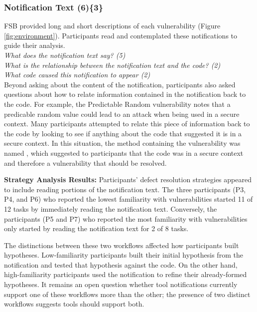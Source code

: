 \documentclass[10pt,journal,compsoc]{IEEEtran}
\begin{document}
\subsubsection{Notification Text (6)\{3\}}\label{em}

FSB provided long and short descriptions of each vulnerability (Figure \ref{fig:environment}). 
Participants read and contemplated these notifications to guide their analysis.
\\

\noindent\emph{What does the notification text say? (5)} \\
\emph{What is the relationship between the notification text and the code? (2)} \\
\emph{What code caused this notification to appear (2)} 
\\

Beyond asking about the content of the notification, participants also asked questions about how to relate information contained in the notification back to the code. 
For example, the Predictable Random vulnerability notes that a predicable random value could lead to an attack when being used in a secure context. 
Many participants attempted to relate this piece of information back to the code by looking to see if anything about the code that suggested it is in a secure context. 
In this situation, the method containing the vulnerability was named , which suggested to participants that the code was in a secure context and therefore a vulnerability that should be resolved.


\textbf{Strategy Analysis Results:}
Participants' defect resolution strategies appeared to include reading portions of the notification text. 
The three participants (P3, P4, and P6) who reported the lowest familiarity with vulnerabilities 
started 11 of 12 tasks by immediately reading the notification text. 
Conversely, the participants (P5 and P7) who reported the most familiarity with vulnerabilities only started by reading the notification text for 2 of 8 tasks.

The distinctions between these two workflows affected how participants built hypotheses.
Low-familiarity participants built their initial hypothesis from the notification and tested that hypothesis against the code. 
On the other hand, high-familiarity participants used the notification to refine their already-formed hypotheses. 
It remains an open question whether tool notifications currently support one of these workflows more than the other; the presence of two distinct workflows suggests tools should support both. 
\end{document}

